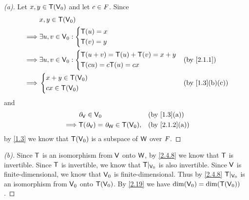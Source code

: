 \begin{proof}[(a)]
  Let \(x, y \in \mathsf{T}(\mathsf{V}_0)\) and let \(c \in \mathit{F}\).
  Since
  \begin{align*}
             & x, y \in \T(\V_0)                                                  \\
    \implies & \exists u, v \in \V_0 : \begin{dcases}
                                         \T(u) = x \\
                                         \T(v) = y
                                       \end{dcases}                              \\
    \implies & \exists u, v \in \V_0 : \begin{dcases}
                                         \T(u + v) = \T(u) + \T(v) = x + y \\
                                         \T(cu) = c \T(u) = cx
                                       \end{dcases} &  & \text{(by \cref{2.1.1})} \\
    \implies & \begin{dcases}
                 x + y \in \T(\V_0) \\
                 cx \in \T(\V_0)
               \end{dcases}                  &  & \text{(by \cref{1.3}(b)(c))}
  \end{align*}
  and
  \begin{align*}
             & \zv_{\V} \in \V_0                     &  & \text{(by \cref{1.3}(a))}   \\
    \implies & \T(\zv_{\V}) = \zv_{\W} \in \T(\V_0), &  & \text{(by \cref{2.1.2}(a))}
  \end{align*}
  by \cref{1.3} we know that \(\mathsf{T}(\mathsf{V}_0)\) is a subspace of \(\mathsf{W}\) over \(\mathit{F}\).
\end{proof}

\begin{proof}[(b)]
  Since \(\mathsf{T}\) is an isomorphism from \(\mathsf{V}\) onto \(\mathsf{W}\), by \cref{2.4.8} we know that \(\mathsf{T}\) is invertible.
  Since \(\mathsf{T}\) is invertible, we know that \(\mathsf{T}|_{\mathsf{V}_0}\) is also invertible.
  Since \(\mathsf{V}\) is finite-dimensional, we know that \(\mathsf{V}_0\) is finite-dimensional.
  Thus by \cref{2.4.8} \(\mathsf{T}|_{\mathsf{V}_0}\) is an isomorphism from \(\mathsf{V}_0\) onto \(\mathsf{T}(\mathsf{V}_0)\).
  By \cref{2.19} we have \(\dim(\mathsf{V}_0) = \dim(\mathsf{T}(\mathsf{V}_0))\).
\end{proof}

